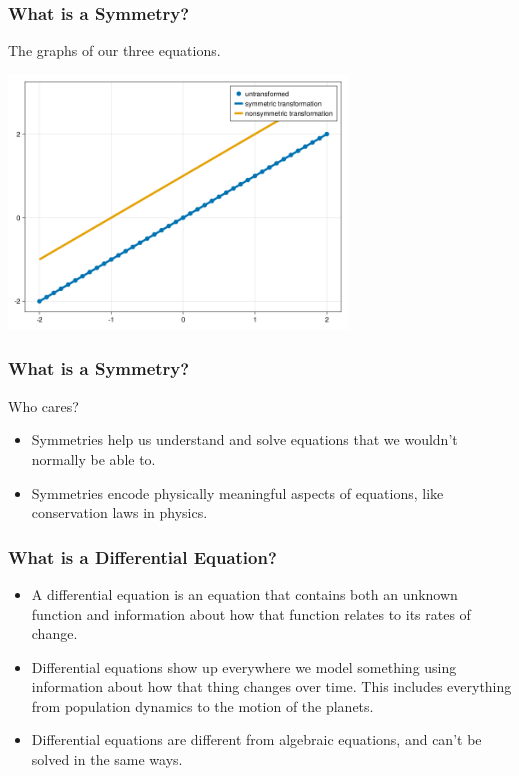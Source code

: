 \documentclass{beamer}
\begin{document}
\begin{frame}
    \frametitle{What is a Symmetry?}
    The graphs of our three equations.\\
    \begin{center}
        \includegraphics[width=9cm]{y=x+1.png}
    \end{center}
\end{frame}



\begin{frame}
    \frametitle{What is a Symmetry?}
    \begin{Large}
        Who cares?
    \end{Large}
    \vspace*{0.25in}
    \begin{itemize}
        \item Symmetries help us understand and solve equations that we wouldn't normally be able to.\pause
        \item Symmetries encode physically meaningful aspects of equations, like conservation laws in physics.\pause
    \end{itemize}
\end{frame}



\begin{frame}
    \frametitle{What is a Differential Equation?}
    \begin{definition}
    \begin{itemize}
        \item A differential equation is an equation that contains both an unknown function and information about how that function relates to its rates of change. \pause
        \item Differential equations show up everywhere we model something using information about how that thing changes over time. This includes everything from population dynamics to the motion of the planets. \pause
        \item Differential equations are different from algebraic equations, and can't be solved in the same ways.
    \end{itemize}
\end{definition}
\end{frame}
\end{document}
